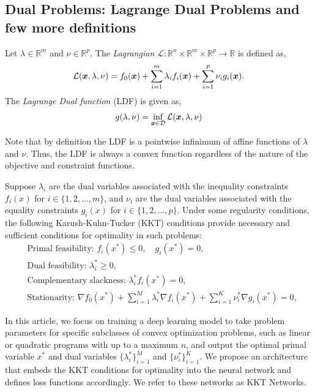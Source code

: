 \documentclass{article} %
\begin{document}
    \subsection{Dual Problems: Lagrange Dual Problems and few more definitions}
    Let $\lambda \in \mathbb{R}^m$ and $\nu \in \mathbb{R}^p$. The \emph{Lagrangian} $\mathcal{L}: \mathbb{R}^n \times \mathbb{R}^m \times \mathbb{R}^p \rightarrow \mathbb{R}$ is defined as, 
    \begin{align}
    \mathcal{L}({\bm{x}}, \lambda, \nu) = f_0({\bm{x}}) + \sum_{i=1}^{m} \lambda_i f_i({\bm{x}}) + \sum_{i=1}^{p} \nu_i g_i({\bm{x}}).
    \end{align} 
    The \emph{Lagrange Dual function} (LDF) is given as,
    \begin{align}
    g(\lambda, \nu) = \inf_{{\bm{x}} \in \mathcal{D}} \mathcal{L}({\bm{x}}, \lambda, \nu)
    \end{align}

    Note that by definition the LDF is a pointwise infinimum of affine functions of $\lambda$ and $\nu$. Thus, the LDF is always a convex function regardless of the nature of the objective and constraint functions.  

    Suppose \( \lambda_i \) are the dual variables associated with the inequality constraints \( f_i(x) \) for \( i \in \{1,2,\ldots,m\} \), and \( \nu_i \) are the dual variables associated with the equality constraints \( g_i(x) \) for \( i \in \{1,2,\ldots,p\} \). Under some regularity conditions, the following Karush-Kuhn-Tucker (KKT) conditions provide necessary and sufficient conditions for optimality in such problems:
    \begin{align}
    &\text{Primal feasibility: } f_i(x^*) \leq 0, \quad g_i(x^*) = 0, \\
    &\text{Dual feasibility: } \lambda_i^* \geq 0, \\
    &\text{Complementary slackness: } \lambda_i^* f_i(x^*) = 0, \\
    &\text{Stationarity: } \nabla f_0(x^*) + \sum_{i=1}^{M} \lambda_i^* \nabla f_i(x^*) + \sum_{i=1}^{K} \nu_i^* \nabla g_i(x^*) = 0,
    \end{align}
    
    In this article, we focus on training a deep learning model to take problem parameters for specific subclasses of convex optimization problems, such as linear or quadratic programs with up to a maximum \( n \), and output the optimal primal variable \( x^* \) and dual variables \( \{ \lambda_i^* \}_{i=1}^M \) and \( \{ \nu_i^* \}_{i=1}^K \).  We propose an architecture that embeds the KKT conditions for optimality into the neural network and defines loss functions accordingly. We refer to these networks as KKT Networks.
\end{document}
